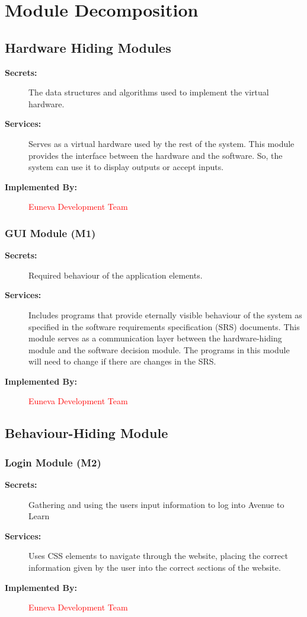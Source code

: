 \documentclass[12pt, titlepage]{article}
\begin{document}
\section{Module Decomposition}
\subsection{Hardware Hiding Modules}
\begin{description}
    \item[\textbf{Secrets:}] The data structures and algorithms used to implement the virtual hardware.
    \item[\textbf{Services:}] Serves as a virtual hardware used by the rest of the system. This module provides the interface between the hardware and the software. So, the system can use it to display outputs or accept inputs.
    \item[\textbf{Implemented By:}] \textcolor{red}{Euneva Development Team}
\end{description}

\subsubsection{GUI Module (M1)}
\begin{description}
    \item[\textbf{Secrets:}] Required behaviour of the application elements.
    \item[\textbf{Services:}] Includes programs that provide eternally visible behaviour of the system as specified in the software requirements specification (SRS) documents. This module serves as a communication layer between the hardware-hiding  module and the software decision module. The programs in this module will need to change if there are changes in the SRS.
    \item[\textbf{Implemented By:}] \textcolor{red}{Euneva Development Team}
\end{description}

\subsection{Behaviour-Hiding Module}
\subsubsection{Login Module (M2)}
\begin{description}
    \item[\textbf{Secrets:}] Gathering and using the users input information to log into Avenue to Learn
    \item[\textbf{Services:}] Uses CSS elements to navigate through the website, placing the correct information given by the user into the correct sections of the website.
    \item[\textbf{Implemented By:}] \textcolor{red}{Euneva Development Team}
\end{description}
\end{document}
